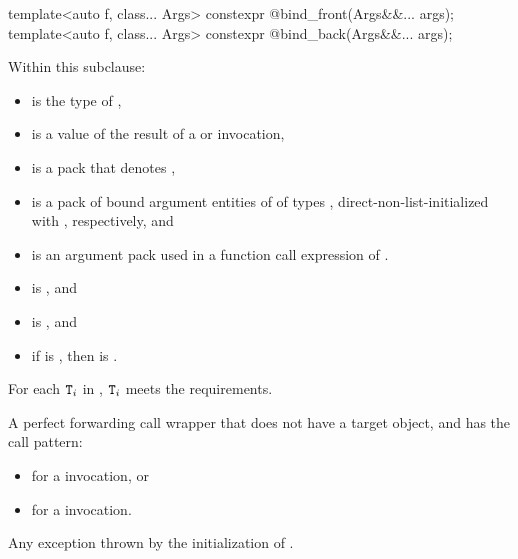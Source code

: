 %
%
\begin{itemdecl}
template<auto f, class... Args>
  constexpr @\unspec@ bind_front(Args&&... args);
template<auto f, class... Args>
  constexpr @\unspec@ bind_back(Args&&... args);
\end{itemdecl}

\begin{itemdescr}
\pnum
Within this subclause:
\begin{itemize}
\item
{} is the type of ,
\item
{} is a value of the result of
a  or  invocation,
\item
{} is a pack that denotes ,
\item
{} is a pack of bound argument entities of
 of types ,
direct-non-list-initialized with ,
respectively, and
\item
{} is an argument pack used in
a function call expression of .
\end{itemize}

\pnum
\mandates
\begin{itemize}
\item
{} is , and
\item
{} is , and
\item
if  is ,
then  is .
\end{itemize}

\pnum
\expects
For each $\texttt{\protect T}_i$ in ,
$\texttt{\protect T}_i$ meets the  requirements.

\pnum
\returns
A perfect forwarding call wrapper  that
does not have a target object, and has the call pattern:
\begin{itemize}
\item
{}
for a  invocation, or
\item
{}
for a  invocation.
\end{itemize}

\pnum
\throws
Any exception thrown by the initialization of .
\end{itemdescr}

